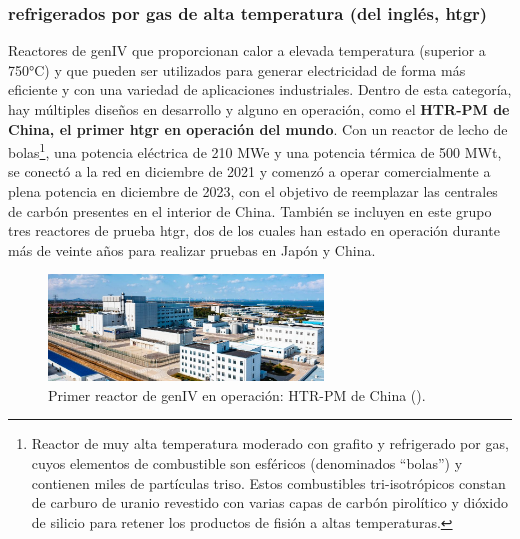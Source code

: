 \subsubsection{ refrigerados por gas de alta temperatura (del inglés, \acrshort{htgr})}

Reactores de \acrshort{genIV} que proporcionan calor a elevada temperatura (superior a 750°C) y que pueden ser utilizados para generar electricidad de forma más eficiente y con una variedad de aplicaciones industriales. Dentro de esta categoría, hay múltiples diseños en desarrollo y alguno en operación, como el \textbf{HTR-PM de China, el primer \acrshort{htgr} en operación del mundo}. Con un reactor de lecho de bolas\footnote{Reactor de muy alta temperatura moderado con grafito y refrigerado por gas, cuyos elementos de combustible son esféricos (denominados ``bolas'') y contienen miles de partículas \acrshort{triso}. Estos combustibles tri-isotrópicos constan de carburo de uranio revestido con varias capas de carbón pirolítico y dióxido de silicio para retener los productos de fisión a altas temperaturas.}, una potencia eléctrica de 210 MWe y una potencia térmica de 500 MWt, se conectó a la red en diciembre de 2021 y comenzó a operar comercialmente a plena potencia en diciembre de 2023, con el objetivo de reemplazar las centrales de carbón presentes en el interior de China. También se incluyen en este grupo tres reactores de prueba \acrshort{htgr}, dos de los cuales han estado en operación durante más de veinte años para realizar pruebas en Japón y China.

\begin{figure}[h]
  \centering
  \includegraphics[width=0.65\textwidth]{content/figures/HTR_PM_china.jpg}
  \caption{Primer reactor de \acrshort{genIV} en operación: HTR-PM de China (\cite{htr_pm_china}).}
  \label{fig:htr_pm_china}
\end{figure}

